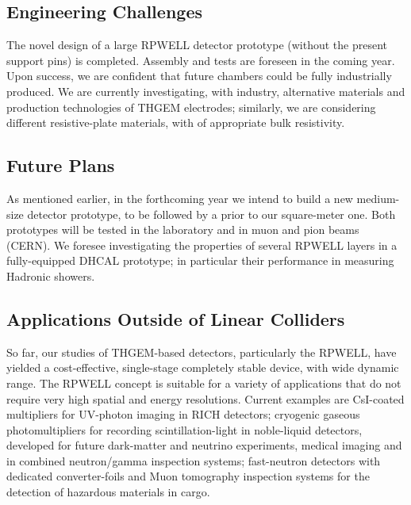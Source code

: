 \subsection{Engineering Challenges}
The novel design of a large RPWELL detector prototype (without the present support pins) is completed. Assembly and tests are foreseen in the coming year. Upon success, we are confident that future chambers could be fully industrially produced.
We are currently investigating, with industry, alternative materials and production technologies of THGEM electrodes; similarly, we are considering different resistive-plate materials, with of appropriate bulk resistivity.

\subsection{Future Plans}
As mentioned earlier, in the forthcoming year we intend to build a new medium-size detector prototype, to be followed by a prior to our square-meter one. Both prototypes will be tested in the laboratory and in muon and pion beams (CERN).
We foresee investigating the properties of several RPWELL layers in a fully-equipped DHCAL prototype; in particular their performance in measuring Hadronic showers.

\subsection{Applications Outside of Linear Colliders}
So far, our studies of THGEM-based detectors, particularly the RPWELL, have yielded a cost-effective, single-stage completely stable device, with wide dynamic range. The RPWELL concept is suitable for a variety of applications that do not require very high spatial and energy resolutions. Current examples are CsI-coated multipliers for UV-photon imaging in RICH detectors; cryogenic gaseous photomultipliers for recording scintillation-light in noble-liquid detectors, developed for future dark-matter and neutrino experiments, medical imaging and in combined neutron/gamma inspection systems; fast-neutron detectors with dedicated converter-foils and Muon tomography inspection systems for the detection of hazardous materials in cargo.
